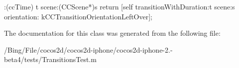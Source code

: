 \begin{DoxyCode}
                            :(ccTime) t scene:(CCScene*)s {
        return [self transitionWithDuration:t scene:s orientation:
      kCCTransitionOrientationLeftOver];
}
\end{DoxyCode}


The documentation for this class was generated from the following file\-:\begin{DoxyCompactItemize}
\item 
/\-Bing/\-File/cocos2d/cocos2d-\/iphone/cocos2d-\/iphone-\/2.-\/beta4/tests/Transitions\-Test.\-m\end{DoxyCompactItemize}
